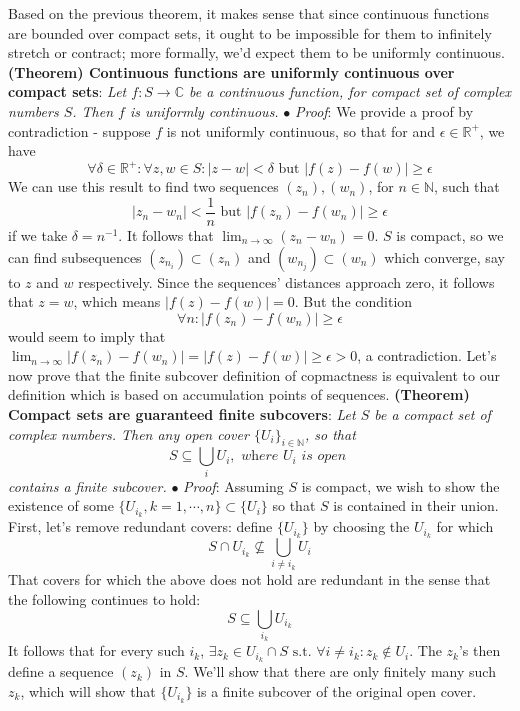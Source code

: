 \documentclass{article}
\newcommand*{\tb}{\textbf}
\newcommand*{\ti}{\textit}
\newcommand*{\n}{\newline}
\newcommand*{\nn}{\newline \newline}
\newcommand*{\Pf}{\indent \ensuremath{\bullet} \textit{Proof}: }
\newcommand*{\N}{\mathbb{N}}
\newcommand*{\R}{\mathbb{R}}
\newcommand*{\C}{\mathbb{C}}
\newcommand*{\st}{\text{ s.t. }}
\begin{document}
\nn
Based on the previous theorem, it makes sense that since continuous functions are bounded over compact sets, it ought to be impossible for them to infinitely stretch or contract; more formally, we'd expect them to be uniformly continuous.
\nn
\tb{(Theorem) Continuous functions are uniformly continuous over compact sets}: \ti{Let $ f: S \rightarrow \C $ be a continuous function, for compact set of complex numbers $ S $. Then $ f $ is uniformly continuous.}
\n
\Pf We provide a proof by contradiction - suppose $ f $ is not uniformly continuous, so that for and $ \epsilon \in \R^+ $, we have
$$ \forall \delta \in \R^+: \forall z, w \in S: | z - w | < \delta \text{ but } | f(z) - f(w) | \geq \epsilon $$
We can use this result to find two sequences $ ( z_n ), ( w_n ) $, for $ n \in \N $, such that
$$ | z_n - w_n | < \frac{1}{n} \text{ but } | f(z_n) - f(w_n) | \geq \epsilon $$
if we take $ \delta = n^{-1} $. It follows that $ \lim_{n \to \infty} (z_n - w_n) = 0 $. $ S $ is compact, so we can find subsequences $ ( z_{n_{i}} ) \subset ( z_n ) $ and $ ( w_{n_{j}} ) \subset ( w_n ) $ which converge, say to $ z $ and $ w $ respectively. Since the sequences' distances approach zero, it follows that $ z = w $, which means $ | f(z) - f(w) | = 0 $. But the condition
$$ \forall n: | f(z_n) - f(w_n) | \geq \epsilon $$
would seem to imply that $ \lim_{n \to \infty} | f(z_n) - f(w_n) | = | f(z) - f(w) | \geq \epsilon > 0 $, a contradiction. \qedsymbol
\nn
Let's now prove that the finite subcover definition of copmactness is equivalent to our definition which is based on accumulation points of sequences.
\nn
\tb{(Theorem) Compact sets are guaranteed finite subcovers}: \ti{Let $ S $ be a compact set of complex numbers. Then any open cover $ \{ U_i \}_{i \in \N} $, so that}
$$ S \subseteq \bigcup_i U_i, \textit{ where } U_i \textit{ is open } $$
\indent \ti{contains a finite subcover.}
\n
\Pf Assuming $ S $ is compact, we wish to show the existence of some $ \{ U_{i_k}, k = 1, \cdots, n \} \subset \{ U_i \} $  so that $ S $ is contained in their union. First, let's remove redundant covers: define $ \{ U_{i_k} \} $ by choosing the $ U_{i_k} $ for which
$$ S \cap U_{i_k} \not \subseteq \bigcup_{i \neq i_k} U_i $$
That covers for which the above does not hold are redundant in the sense that the following continues to hold:
$$ S \subseteq \bigcup_{i_k} U_{i_k} $$
It follows that for every such $ i_k $, $ \exists z_k \in U_{i_k} \cap S \st \forall i \neq i_k: z_k \not \in U_i $. The $ z_k $'s then define a sequence $ (z_k) $ in $ S $. We'll show that there are only finitely many such $ z_k $, which will show that $ \{ U_{i_k} \} $ is a finite subcover of the original open cover.
\end{document}
